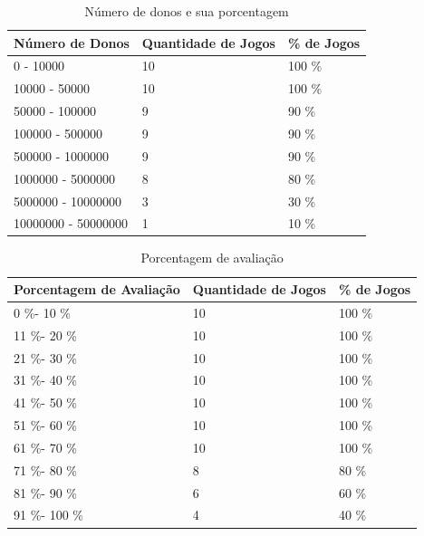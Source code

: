 \begin{table}
\centering
\begin{tabular}{|p{5cm}|p{5cm}|p{5cm}|}
\hline \textbf{Número de Donos} & \textbf{Quantidade de Jogos} & \textbf{\% de Jogos} \\
\hline 0 - 10000 & 10 & 100 \% \\
\hline 10000 - 50000 & 10 & 100 \% \\
\hline 50000 - 100000 & 9 & 90 \% \\
\hline 100000 - 500000 & 9 & 90 \% \\
\hline 500000 - 1000000 & 9 & 90 \% \\
\hline 1000000 - 5000000 & 8 & 80 \% \\
\hline 5000000 - 10000000 & 3 & 30 \% \\
\hline 10000000 - 50000000 & 1 & 10 \% \\
\hline
\end{tabular}
\caption{Número de donos e sua porcentagem}
\label{table:num_donos}
\end{table}
\begin{table}
\centering
\begin{tabular}{|p{5cm}|p{5cm}|p{5cm}|}
\hline \textbf{Porcentagem de Avaliação} & \textbf{Quantidade de Jogos} & \textbf{\% de Jogos} \\
\hline 0 \%- 10 \% & 10 & 100 \% \\
\hline 11 \%- 20 \% & 10 & 100 \% \\
\hline 21 \%- 30 \% & 10 & 100 \% \\
\hline 31 \%- 40 \% & 10 & 100 \% \\
\hline 41 \%- 50 \% & 10 & 100 \% \\
\hline 51 \%- 60 \% & 10 & 100 \% \\
\hline 61 \%- 70 \% & 10 & 100 \% \\
\hline 71 \%- 80 \% & 8 & 80 \% \\
\hline 81 \%- 90 \% & 6 & 60 \% \\
\hline 91 \%- 100 \% & 4 & 40 \% \\
\hline
\end{tabular}
\caption{Porcentagem de avaliação}
\label{table:avaliacao}
\end{table}